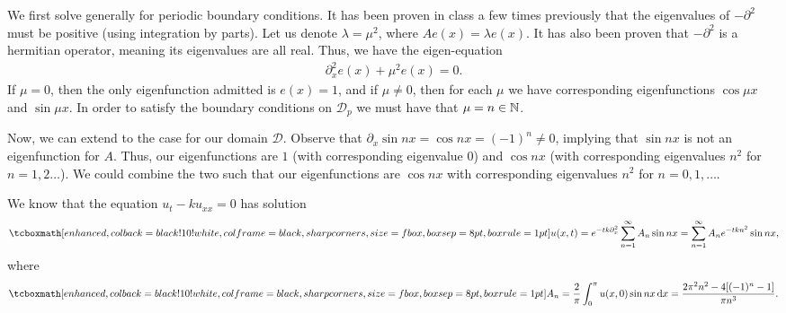 \def\duedate{10/27/22}
\def\HWnum{7}



    

We first solve generally for periodic boundary conditions.
It has been proven in class a few times previously that the eigenvalues of $-\partial^2$ must be positive (using integration by parts).
Let us denote $\lambda = \mu^2$, where $A e(x) = \lambda e(x)$.
It has also been proven that $-\partial^2$ is a hermitian operator, meaning its eigenvalues are all real.
Thus, we have the eigen-equation
\begin{eqnarray}
    \label{eq:eigen-eq}
    \partial_{x}^2e(x) + \mu^2e(x) = 0
.\end{eqnarray}
If $\mu = 0$, then the only eigenfunction admitted is $e(x) = 1$, and if $\mu \ne 0$, then for each $\mu$ we have corresponding eigenfunctions $\cos{\mu x}$ and $\sin{\mu x}$.
In order to satisfy the boundary conditions on $\mathcal{D}_{p}$ we must have that $\mu = n \in \mathbb{N}$.

Now, we can extend to the case for our domain $\mathcal{D}$.
Observe that $\partial_{x} \sin{nx} = \cos{n x} = (-1)^{n} \ne 0$, implying that $\sin{nx}$ is not an eigenfunction for $A$.
Thus, our eigenfunctions are $1$ (with corresponding eigenvalue $0$) and $\cos{nx}$ (with corresponding eigenvalues $n^2$ for $n = 1,2\ldots$).
We could combine the two such that our eigenfunctions are $\cos{nx}$ with corresponding eigenvalues $n^2$ for $n = 0,1,\ldots$.


We know that the equation $u_{t} - ku_{xx} = 0$ has solution
\begin{eqnarray}
    \label{eq:sol-2}
    \eqbox{
        u(x,t) = e^{-tk\partial_{x}^2} \sum_{n=1}^{\infty} A_{n} \sin{n x} = \sum_{n=1}^{\infty} A_{n} e^{-tkn^2}\sin{nx}
    }
,\end{eqnarray}
where
\begin{eqnarray}
    \label{eq:An}
    \eqbox{
    A_{n} = \frac{2}{\pi}\int_{0}^{\pi} u(x,0) \sin{n x} \dd{x} = \frac{2 \pi^2 n^2 - 4[(-1)^{n} - 1]}{\pi n^3}
}
.\end{eqnarray}



